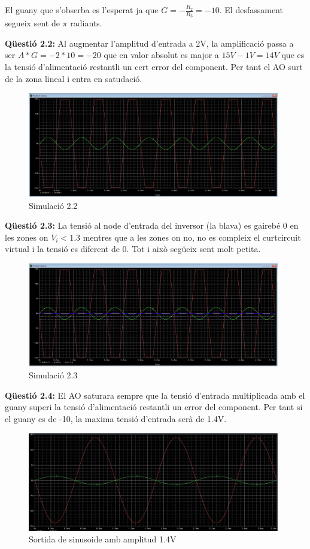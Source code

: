 \documentclass[12pt, a4papre]{article}
\begin{document}
	El guany que s'obserba es l'esperat ja que $G = -\frac{R_2}{R_3} = -10$. El desfassament segueix sent de $\pi$ radiants.
	
	\textbf{Qüestió 2.2:} Al augmentar l'amplitud d'entrada a 2V, la amplificació passa a ser $A*G = -2*10 = -20$ que en valor absolut es major a $15V - 1V = 14V$ que es la tensió d'alimentació restantli un cert error del component. Per tant el AO surt de la zona lineal i entra en satudació.
	\begin{figure}[H]
		\begin{center}
		\includegraphics[width=110mm]{Captura_2.2.PNG}
		\caption{Simulació 2.2}
		\end{center}
	\end{figure}
	
	\textbf{Qüestió 2.3:} La tensió al node d'entrada del inversor (la blava) es gairebé 0 en les zones on $V_i < 1.3$ mentres que a les zones on no, no es compleix el curtcircuit virtual i la tensió es diferent de 0. Tot i això següeix sent molt petita.
	\begin{figure}[H]
		\begin{center}
		\includegraphics[width=110mm]{Captura_2.3.PNG}
		\caption{Simulació 2.3}
		\end{center}
	\end{figure}
	
	\textbf{Qüestió 2.4:} El AO saturara sempre que la tensió d'entrada multiplicada amb el guany superi la tensió d'alimentació restantli un error del component. Per tant si el guany es de -10, la maxima tensió d'entrada serà de 1.4V.
	\begin{figure}[H]
		\begin{center}
		\includegraphics[width=110mm]{Captura_2.4_1.PNG}
		\caption{Sortida de sinusoide amb amplitud 1.4V}
		\end{center}
	\end{figure}
	
\end{document}
